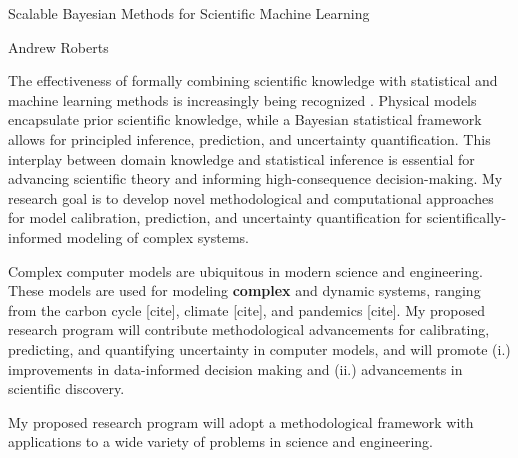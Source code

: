 \documentclass[12pt]{article}
\begin{document}
\begin{center}
Scalable Bayesian Methods for Scientific Machine Learning
\end{center}

\begin{flushright}
Andrew Roberts
\end{flushright} 

The effectiveness of formally combining scientific knowledge with statistical and machine learning methods is increasingly being recognized \cite{Willcox}. Physical models
encapsulate prior scientific knowledge, while a Bayesian statistical framework allows for principled inference, prediction, and uncertainty quantification. This interplay between domain 
knowledge and statistical inference is essential for advancing scientific theory and informing high-consequence decision-making. My research goal is to develop novel methodological 
and computational approaches for model calibration, prediction, and uncertainty quantification for scientifically-informed modeling of complex systems. 

Complex computer models are ubiquitous in modern science and engineering. These models are used for modeling \textbf{complex} and dynamic systems, ranging from the carbon cycle [cite], climate [cite], and pandemics [cite]. My proposed research program will contribute methodological advancements for calibrating, predicting, and quantifying uncertainty in computer models, and
will promote (i.) improvements in data-informed decision making and (ii.) advancements in scientific discovery. 



My proposed research program will adopt a methodological framework with applications to a wide variety of problems in science and engineering. 
\end{document}
